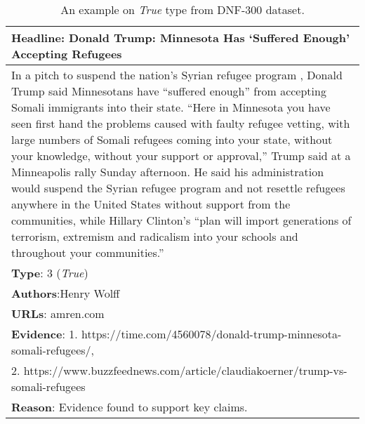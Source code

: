 \documentclass[11pt,a4paper]{article}
\begin{document}
\begin{table*}[t]
\centering
\begin{tabular}{p{15cm}}
\hline
\textbf{Headline}: Donald Trump: Minnesota Has ‘Suffered Enough’ Accepting Refugees\\
\hline 
In a pitch to suspend the nation’s Syrian refugee program , Donald Trump said Minnesotans have ``suffered enough'' from accepting Somali immigrants into their state. ``Here in Minnesota you have seen first hand the problems caused with faulty refugee vetting, with large numbers of Somali refugees coming into your state, without your knowledge, without your support or approval,'' Trump said at a Minneapolis rally Sunday afternoon. He said his administration would suspend the Syrian refugee program and not resettle refugees anywhere in the United States without support from the communities, while Hillary Clinton’s ``plan will import generations of terrorism, extremism and radicalism into your schools and throughout your communities.''\\
\hline
\textbf{Type}: 3 (\textit{True})\\
\textbf{Authors}:Henry Wolff\\
\textbf{URLs}: amren.com\\
\hline
\textbf{Evidence}: 1. https://time.com/4560078/donald-trump-minnesota-somali-refugees/,\\
2. https://www.buzzfeednews.com/article/claudiakoerner/trump-vs-somali-refugees\\
\hline
\textbf{Reason}: Evidence found to support key claims.\\
\hline
\end{tabular}
\caption{\label{tab:dnf300_true}An example on \textit{True} type from DNF-300 dataset. 
}
\end{table*}
\end{document}

